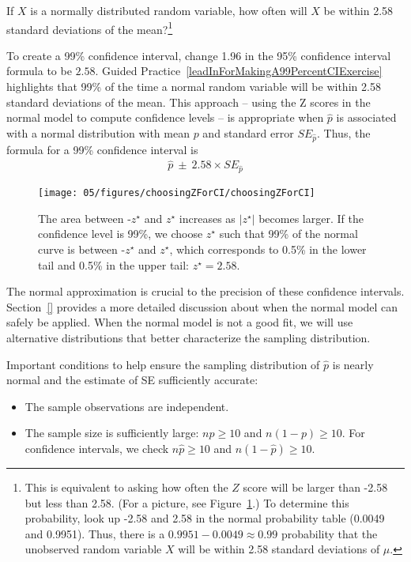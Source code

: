 \begin{exercise} \label{leadInForMakingA99PercentCIExercise}
If $X$ is a normally distributed random variable, how often will $X$ be within 2.58 standard deviations of the mean?\footnote{This is equivalent to asking how often the $Z$ score will be larger than -2.58 but less than 2.58. (For a picture, see Figure~\ref{choosingZForCI}.) To determine this probability, look up -2.58 and 2.58 in the normal probability table (0.0049 and 0.9951). Thus, there is a $0.9951-0.0049 \approx 0.99$ probability that the unobserved random variable $X$ will be within 2.58 standard deviations of $\mu$.}
\end{exercise}

To create a 99\% confidence interval, change 1.96 in the 95\% confidence interval formula to be $2.58$. Guided Practice~\ref{leadInForMakingA99PercentCIExercise} highlights that 99\% of the time a normal random variable will be within 2.58 standard deviations of the mean. This approach -- using the Z scores in the normal model to compute confidence levels -- is appropriate when $\hat{p}$ is associated with a normal distribution with mean $p$ and standard error $SE_{\hat{p}}$. Thus, the formula for a 99\% confidence interval is
\begin{eqnarray}
\hat{p}\ \pm\ 2.58\times SE_{\hat{p}}
\label{99PercCIForPHat}
\end{eqnarray}

\begin{figure}
\centering
\texttt{[image: 05/figures/choosingZForCI/choosingZForCI]}
\caption{The area between -$z^{\star}$ and $z^{\star}$ increases as $|z^{\star}|$ becomes larger. If the confidence level is 99\%, we choose $z^{\star}$ such that 99\% of the normal curve is between -$z^{\star}$ and $z^{\star}$, which corresponds to 0.5\% in the lower tail and 0.5\% in the upper tail: $z^{\star}=2.58$.}
\label{choosingZForCI}
\end{figure}

The normal approximation is crucial to the precision of these confidence intervals. Section~\ref{} provides a more detailed discussion about when the normal model can safely be applied. When the normal model is not a good fit, we will use alternative distributions that better characterize the sampling distribution.

\begin{termBox}{
Important conditions to help ensure the sampling distribution of $\hat{p}$ is nearly normal and the estimate of SE sufficiently accurate:
\begin{itemize}
\setlength{\itemsep}{0mm}
\item The sample observations are independent.
\item The sample size is sufficiently large: $np \geq 10$ and $n(1-p) \geq 10$. For confidence intervals, we check $n\hat{p} \geq 10$ and $n(1-\hat{p}) \geq 10$.
\end{itemize}}
\end{termBox}

